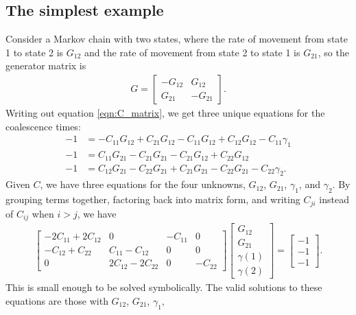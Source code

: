 \documentclass{article}
\begin{document}
\subsection*{The simplest example}

Consider a Markov chain with two states, 
where the rate of movement from state 1 to state 2 is $G_{12}$
and the rate of movement from state 2 to state 1 is $G_{21}$,
so the generator matrix is
\begin{align*}
G = 
    \begin{bmatrix}
        -G_{12}  & G_{12} \\
         G_{21}  & -G_{21}
    \end{bmatrix}.
\end{align*}
Writing out equation \ref{eqn:C_matrix}, we get three unique equations
for the coalescence times:
\begin{align*}
   -1 &= -C_{11} G_{12} + C_{21} G_{12} - C_{11} G_{12} + C_{12} G_{12} - C_{11} \gamma_1 \\
   -1 &=  C_{11} G_{21} - C_{21} G_{21} - C_{21} G_{12} + C_{22} G_{12} \\
   -1 &=  C_{12} G_{21} - C_{22} G_{21} + C_{21} G_{21} - C_{22} G_{21} - C_{22} \gamma_2 .
\end{align*}
Given $C$, we have three equations for the four unknowns, 
$G_{12}$, $G_{21}$, $\gamma_{1}$, and $\gamma_{2}$.
By grouping terms together, factoring back into matrix form, 
and writing $C_{ji}$ instead of $C_{ij}$ when $i > j$,
we have
\begin{align*}
\begin{bmatrix}
-2C_{11} + 2C_{12} & 0                 & -C_{11} & 0       \\
-C_{12} + C_{22}   & C_{11} - C_{12}   & 0       & 0       \\
0                  & 2C_{12} - 2C_{22} & 0       & -C_{22}
\end{bmatrix}
\begin{bmatrix}
G_{12} \\ G_{21} \\ \gamma(1) \\ \gamma(2)
\end{bmatrix}
=
\begin{bmatrix}
-1 \\ -1 \\ -1
\end{bmatrix}.
\end{align*}
This is small enough to be solved symbolically. 
The valid solutions to these equations are those with $G_{12}$, $G_{21}$, $\gamma_1$,
\end{document}
